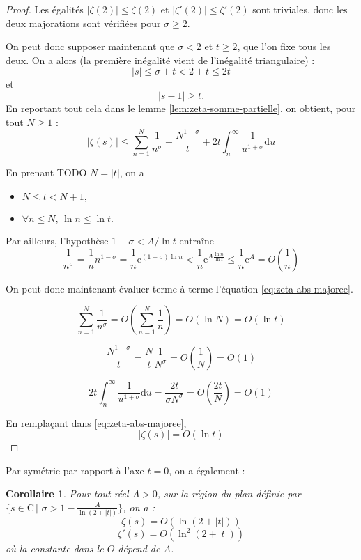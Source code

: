 \documentclass[french]{report}
\newtheorem{corollary}[theorem]{Corollaire}
\begin{document}
\begin{proof}
  Les égalités $|\zeta(2)|\leq\zeta(2)$ et $|\zeta'(2)|\leq\zeta'(2)$ sont triviales, donc les deux majorations sont vérifiées pour $\sigma\geq2$.

  On peut donc supposer maintenant que $\sigma<2$ et $t\geq2$, que l'on fixe tous les deux. On a alors (la première inégalité vient de l'inégalité triangulaire) :
  \[ |s|\leq\sigma+t<2+t\leq 2t \]
  et
  \[ |s-1|\geq t. \]
  En reportant tout cela dans le lemme \ref{lem:zeta-somme-partielle}, on obtient, pour tout $N\geq1$ :
  \begin{equation}\label{eq:zeta-abs-majoree}
    |\zeta(s)|\leq\sum_{n=1}^N\frac{1}{n^\sigma}
    + \frac{N^{1-\sigma}}{t}
    + 2t\int_n^\infty\frac{1}{u^{1+\sigma}}\mathrm{d}u
  \end{equation}
 
  En prenant TODO $N=|t|$, on a
  \begin{itemize}
    \item $N\leq t<N+1,$
    \item $\forall n\leq N,\,\ln n\leq\ln t.$
  \end{itemize}

  Par ailleurs, l'hypothèse $1-\sigma<A/\ln t$ entraîne
  \[ \frac{1}{n^\sigma}
  = \frac{1}{n}n^{1-\sigma}
  = \frac{1}{n}\mathrm{e}^{(1-\sigma)\ln n}
  < \frac{1}{n}\mathrm{e}^{A\frac{\ln n}{\ln t}}
  \leq \frac{1}{n}\mathrm{e}^A
  = O\left(\frac{1}{n}\right)
  \]

  On peut donc maintenant évaluer terme à terme l'équation \ref{eq:zeta-abs-majoree}.

  \[ \sum_{n=1}^N\frac{1}{n^\sigma}
  = O\left(\sum_{n=1}^N\frac{1}{n}\right)
  = O(\ln N)
  = O(\ln t)
  \]

  \[ \frac{N^{1-\sigma}}{t}
  = \frac{N}{t}\frac{1}{N^\sigma}
  = O\left(\frac{1}{N}\right)
  = O(1)
  \]

  \[ 2t\int_n^\infty\frac{1}{u^{1+\sigma}}\mathrm{d}u
  = \frac{2t}{\sigma N^\sigma}
  = O\left(\frac{2t}{N}\right)
  = O(1)
  \]

  En remplaçant dans \ref{eq:zeta-abs-majoree},
  \[ |\zeta(s)|=O(\ln t) \]
\end{proof}

Par symétrie par rapport à l'axe $t=0$, on a également :

\begin{corollary}\label{cor:majoration-zeta-et-zeta-prime}
  Pour tout réel $A>0$, sur la région du plan définie par $\{s\in\mathrm{C}\,|\,\,\sigma>1-\frac{A}{\ln (2+|t|)}\}$, on a :
  \[ \zeta(s) = O(\ln (2+|t|)) \]
  \[ \zeta'(s) = O(\ln^2 (2+|t|)) \]
  où la constante dans le $O$ dépend de $A$.
\end{corollary}
\end{document}

